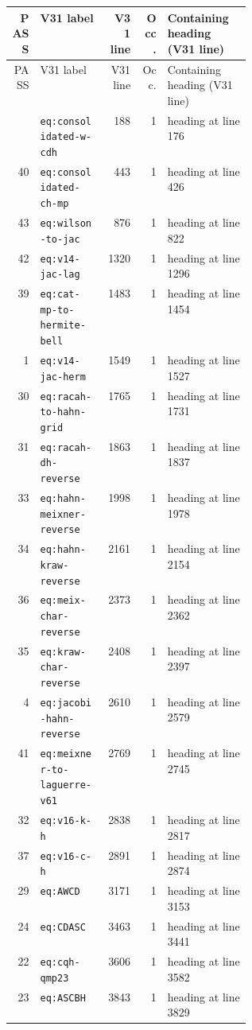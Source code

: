 \documentclass[11pt]{article}
\begin{document}
\begingroup\scriptsize\setlength{\tabcolsep}{4pt}
\begin{longtable}{@{}r l r r p{0.35\linewidth}@{}}
\toprule PASS & V31 label & V31 line & Occ. & Containing heading (V31 line)\\
\midrule\endfirsthead
\toprule PASS & V31 label & V31 line & Occ. & Containing heading (V31 line)\\
\midrule\endhead\bottomrule\endfoot
38 & \texttt{eq:consolidated-w-cdh} & 188 & 1 & heading at line 176 \\
40 & \texttt{eq:consolidated-ch-mp} & 443 & 1 & heading at line 426 \\
43 & \texttt{eq:wilson-to-jac} & 876 & 1 & heading at line 822 \\
42 & \texttt{eq:v14-jac-lag} & 1320 & 1 & heading at line 1296 \\
39 & \texttt{eq:cat-mp-to-hermite-bell} & 1483 & 1 & heading at line 1454 \\
1 & \texttt{eq:v14-jac-herm} & 1549 & 1 & heading at line 1527 \\
30 & \texttt{eq:racah-to-hahn-grid} & 1765 & 1 & heading at line 1731 \\
31 & \texttt{eq:racah-dh-reverse} & 1863 & 1 & heading at line 1837 \\
33 & \texttt{eq:hahn-meixner-reverse} & 1998 & 1 & heading at line 1978 \\
34 & \texttt{eq:hahn-kraw-reverse} & 2161 & 1 & heading at line 2154 \\
36 & \texttt{eq:meix-char-reverse} & 2373 & 1 & heading at line 2362 \\
35 & \texttt{eq:kraw-char-reverse} & 2408 & 1 & heading at line 2397 \\
4 & \texttt{eq:jacobi-hahn-reverse} & 2610 & 1 & heading at line 2579 \\
41 & \texttt{eq:meixner-to-laguerre-v61} & 2769 & 1 & heading at line 2745 \\
32 & \texttt{eq:v16-k-h} & 2838 & 1 & heading at line 2817 \\
37 & \texttt{eq:v16-c-h} & 2891 & 1 & heading at line 2874 \\
29 & \texttt{eq:AWCD} & 3171 & 1 & heading at line 3153 \\
24 & \texttt{eq:CDASC} & 3463 & 1 & heading at line 3441 \\
22 & \texttt{eq:cqh-qmp23} & 3606 & 1 & heading at line 3582 \\
23 & \texttt{eq:ASCBH} & 3843 & 1 & heading at line 3829 \\

\end{longtable}
\end{document}
